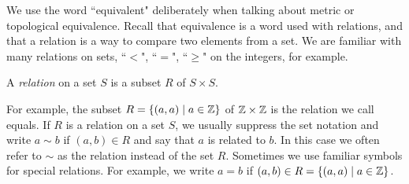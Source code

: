 \begin{comment}

\ActivitySolution

\ba
\item Let $x = (x_1,x_2)$ and $y=(y_1,y_2)$ be in $\R^2$. Notice that 
\[d_M(x,y) = \max\{| x_1-y_1 |, | x_2-y_2 |\} \leq | x_1-y_1 | + | x_2-y_2 | = d_T(x,y).\]
Also,
\[d_T(x,y) = | x_1-y_1 | + | x_2-y_2 | \leq 2\max\{| x_1-y_1 |, | x_2-y_2 |\} = 2d_M(x,y).\]
So $(\R^2,d_T)$ and $(\R^2, d_M)$ are topologically equivalent. 

\item Let $x = (x_1,x_2)$ and $y=(y_1,y_2)$ be in $\R^2$. Notice that 
\[d_E(x,y) = \sqrt{(x_1-y_1)^2 + (x_2-y_2)^2} \leq \sqrt{(x_1-y_1)^2} + \sqrt{(x_2-y_2)^2} =  | x_1-y_1 | + | x_2-y_2 | \leq d_T(x,y).\]
Also,
\[d_T(x,y) = | x_1-y_1 | + | x_2-y_2 | = \sqrt{(x_1-y_1)^2} + \sqrt{(x_2-y_2)^2} \leq \sqrt{(x_1-y_1)^2+(x_2-y_2)^2} + \sqrt{(x_1-y_1)^2+(x_2-y_2)^2} = 2d_E(x,y).\]
So $(\R^2,d_T)$ and $(\R^2, d_T)$ are topologically equivalent. 

\item If $f: (\R^2,d_T) \to (\R^2, d_M)$ and $g: (\R^2,d_E) \to (\R^2, d_T)$ are homeomorphisms, then we know that $f \circ g$ is a continuous bijection as is $(f \circ g)^{-1}$. So it must be the case that $(\R^2,d_E)$ and $(\R^2, d_M)$ are topologically equivalent. 
 
\ea

\end{comment}


We use the word ``equivalent" deliberately when talking about metric or topological equivalence. Recall that equivalence is a word used with relations, and that a relation is a way to compare two elements from a set. We are familiar with many relations on sets, ``$<$", ``$=$", ``$\geq$" on the integers, for example.  

\begin{definition} A \emph{relation} on a set $S$ is a subset $R$ of $S \times S$.
\end{definition}

For example, the subset $R = \{(a,a) \mid a \in \mathbb{Z} \}$ of $\mathbb{Z} \times \mathbb{Z}$ is the relation we call equals. If $R$ is a relation on a set $S$, we usually suppress the set notation and write $a \sim b$ if $(a,b) \in R$ and say that $a$ is related to $b$. In this case we often refer to $\sim$ as the relation instead of the set $R$. Sometimes we use familiar symbols for special relations. For example, we write $a = b$ if $(a,b) \in R = \{(a,a) \mid a \in \mathbb{Z} \}$.

